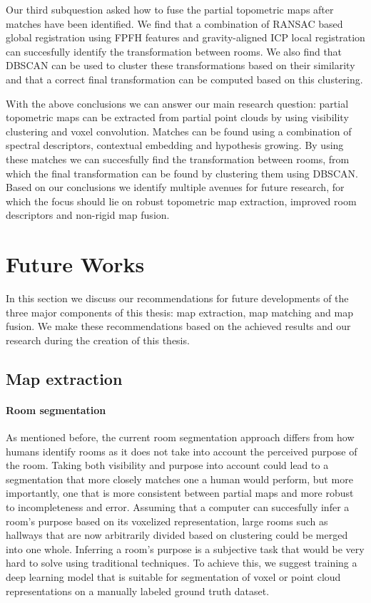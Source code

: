 Our third subquestion asked how to fuse the partial topometric maps after matches have been identified. We find that a combination of RANSAC based global registration using FPFH features and gravity-aligned ICP local registration can succesfully identify the transformation between rooms. We also find that DBSCAN can be used to cluster these transformations based on their similarity and that a correct final transformation can be computed based on this clustering. 

With the above conclusions we can answer our main research question: partial topometric maps can be extracted from partial point clouds by using visibility clustering and voxel convolution. Matches can be found using a combination of spectral descriptors, contextual embedding and hypothesis growing. By using these matches we can succesfully find the transformation between rooms, from which the final transformation can be found by clustering them using DBSCAN. Based on our conclusions we identify multiple avenues for future research, for which the focus should lie on robust topometric map extraction, improved room descriptors and non-rigid map fusion.

\pagebreak

\section{Future Works}
In this section we discuss our recommendations for future developments of the three major components of this thesis: map extraction, map matching and map fusion. We make these recommendations based on the achieved results and our research during the creation of this thesis. 

\subsection{Map extraction}

\paragraph{Room segmentation}
As mentioned before, the current room segmentation approach differs from how humans identify rooms as it does not take into account the perceived purpose of the room. Taking both visibility and purpose into account could lead to a segmentation that more closely matches one a human would perform, but more importantly, one that is more consistent between partial maps and more robust to incompleteness and error. Assuming that a computer can succesfully infer a room's purpose based on its voxelized representation, large rooms such as hallways that are now arbitrarily divided based on clustering could be merged into one whole. Inferring a room's purpose is a subjective task that would be very hard to solve using traditional techniques. To achieve this, we suggest training a deep learning model that is suitable for segmentation of voxel or point cloud representations on a manually labeled ground truth dataset. 

